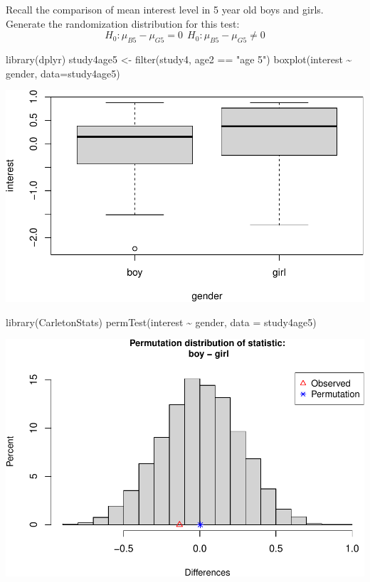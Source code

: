 \documentclass[
]{book}
\newenvironment{Shaded}{\begin{snugshade}}{\end{snugshade}}
\newcommand{\AttributeTok}[1]{\textcolor[rgb]{0.77,0.63,0.00}{#1}}
\newcommand{\FunctionTok}[1]{\textcolor[rgb]{0.00,0.00,0.00}{#1}}
\newcommand{\NormalTok}[1]{#1}
\newcommand{\OtherTok}[1]{\textcolor[rgb]{0.56,0.35,0.01}{#1}}
\newcommand{\SpecialCharTok}[1]{\textcolor[rgb]{0.00,0.00,0.00}{#1}}
\newcommand{\StringTok}[1]{\textcolor[rgb]{0.31,0.60,0.02}{#1}}
\begin{document}
Recall the comparison of mean interest level in 5 year old boys and girls. Generate the randomization distribution for this test:
\[
H_0: \mu_{B5} - \mu_{G5} = 0 \ \ H_0: \mu_{B5} - \mu_{G5} \neq 0
\]

\begin{Shaded}
\begin{Highlighting}[]
\FunctionTok{library}\NormalTok{(dplyr)}
\NormalTok{study4age5 }\OtherTok{\textless{}{-}} \FunctionTok{filter}\NormalTok{(study4, age2 }\SpecialCharTok{==} \StringTok{"age 5"}\NormalTok{)}
\FunctionTok{boxplot}\NormalTok{(interest }\SpecialCharTok{\textasciitilde{}}\NormalTok{ gender, }\AttributeTok{data=}\NormalTok{study4age5)}
\end{Highlighting}
\end{Shaded}

\includegraphics[width=1\linewidth]{Class_Activity_14_files/figure-latex/unnamed-chunk-2-1}

\begin{Shaded}
\begin{Highlighting}[]
\FunctionTok{library}\NormalTok{(CarletonStats)}
\FunctionTok{permTest}\NormalTok{(interest }\SpecialCharTok{\textasciitilde{}}\NormalTok{ gender, }\AttributeTok{data =}\NormalTok{ study4age5)}
\end{Highlighting}
\end{Shaded}

\includegraphics[width=1\linewidth]{Class_Activity_14_files/figure-latex/unnamed-chunk-2-2}
\end{document}
